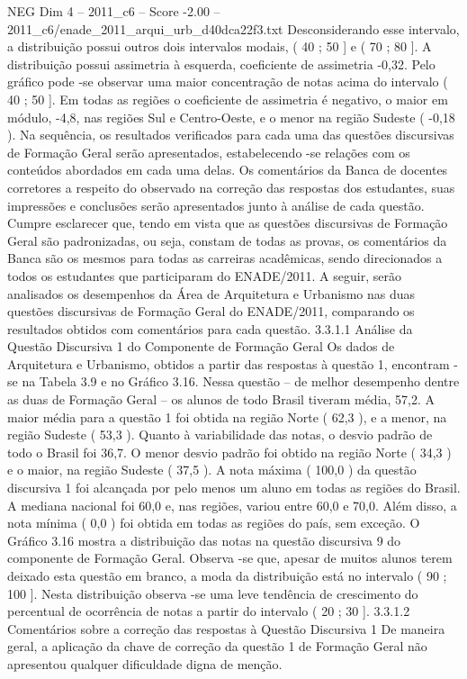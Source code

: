 \begin{textsample}{NEG Dim 4 – 2011\_c6 – Score -2.00 – 2011\_c6/enade\_2011\_arqui\_urb\_d40dca22f3.txt}
Desconsiderando esse intervalo, a distribuição possui outros dois intervalos modais, ( 40 ; 50 ] e ( 70 ; 80 ].
A distribuição possui assimetria à esquerda, coeficiente de assimetria -0,32.
Pelo gráfico pode -se observar uma maior concentração de notas acima do intervalo ( 40 ; 50 ].
Em todas as regiões o coeficiente de assimetria é negativo, o maior em módulo, -4,8, nas regiões Sul e Centro-Oeste, e o menor na região Sudeste ( -0,18 ).
Na sequência, os resultados verificados para cada uma das questões discursivas de Formação Geral serão apresentados, estabelecendo -se relações com os conteúdos abordados em cada uma delas.
Os comentários da Banca de docentes corretores a respeito do observado na correção das respostas dos estudantes, suas impressões e conclusões serão apresentados junto à análise de cada questão.
Cumpre esclarecer que, tendo em vista que as questões discursivas de Formação Geral são padronizadas, ou seja, constam de todas as provas, os comentários da Banca são os mesmos para todas as carreiras acadêmicas, sendo direcionados a todos os estudantes que participaram do ENADE/2011.
A seguir, serão analisados os desempenhos da Área de Arquitetura e Urbanismo nas duas questões discursivas de Formação Geral do ENADE/2011, comparando os resultados obtidos com comentários para cada questão. 3.3.1.1 Análise da Questão Discursiva 1 do Componente de Formação Geral Os dados de Arquitetura e Urbanismo, obtidos a partir das respostas à questão 1, encontram -se na Tabela 3.9 e no Gráfico 3.16.
Nessa questão – de melhor desempenho dentre as duas de Formação Geral – os alunos de todo Brasil tiveram média, 57,2.
A maior média para a questão 1 foi obtida na região Norte ( 62,3 ), e a menor, na região Sudeste ( 53,3 ).
Quanto à variabilidade das notas, o desvio padrão de todo o Brasil foi 36,7.
O menor desvio padrão foi obtido na região Norte ( 34,3 ) e o maior, na região Sudeste ( 37,5 ).
A nota máxima ( 100,0 ) da questão discursiva 1 foi alcançada por pelo menos um aluno em todas as regiões do Brasil.
A mediana nacional foi 60,0 e, nas regiões, variou entre 60,0 e 70,0.
Além disso, a nota mínima ( 0,0 ) foi obtida em todas as regiões do país, sem exceção.
O Gráfico 3.16 mostra a distribuição das notas na questão discursiva 9 do componente de Formação Geral.
Observa -se que, apesar de muitos alunos terem deixado esta questão em branco, a moda da distribuição está no intervalo ( 90 ; 100 ].
Nesta distribuição observa -se uma leve tendência de crescimento do percentual de ocorrência de notas a partir do intervalo ( 20 ; 30 ]. 3.3.1.2 Comentários sobre a correção das respostas à Questão Discursiva 1 De maneira geral, a aplicação da chave de correção da questão 1 de Formação Geral não apresentou qualquer dificuldade digna de menção.

\end{textsample}
